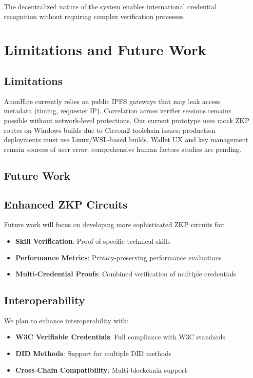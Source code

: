 \documentclass[conference]{IEEEtran}
\begin{document}
The decentralized nature of the system enables international credential recognition without requiring complex verification processes.

\section{Limitations and Future Work}

\label{sec:limitations}
\subsection{Limitations}
AnonHire currently relies on public IPFS gateways that may leak access metadata (timing, requester IP). Correlation across verifier sessions remains possible without network-level protections. Our current prototype uses mock ZKP routes on Windows builds due to Circom2 toolchain issues; production deployments must use Linux/WSL-based builds. Wallet UX and key management remain sources of user error; comprehensive human factors studies are pending.

\subsection{Future Work}

\subsection{Enhanced ZKP Circuits}

Future work will focus on developing more sophisticated ZKP circuits for:

\begin{itemize}
\item \textbf{Skill Verification}: Proof of specific technical skills
\item \textbf{Performance Metrics}: Privacy-preserving performance evaluations
\item \textbf{Multi-Credential Proofs}: Combined verification of multiple credentials
\end{itemize}

\subsection{Interoperability}

We plan to enhance interoperability with:

\begin{itemize}
\item \textbf{W3C Verifiable Credentials}: Full compliance with W3C standards
\item \textbf{DID Methods}: Support for multiple DID methods
\item \textbf{Cross-Chain Compatibility}: Multi-blockchain support
\end{itemize}
\end{document}
